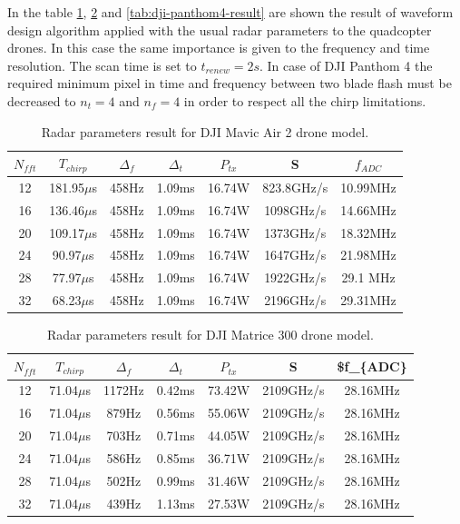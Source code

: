 In the table \ref{tab:dji-air2-result}, \ref{tab:dji-matrice300-result} and \ref{tab:dji-panthom4-result} are shown the result of waveform design algorithm applied with the usual radar parameters to the quadcopter drones. In this case the same importance is given to the frequency and time resolution. The scan time is set to $t_{renew} = 2s $. In case of DJI Panthom 4 the required minimum pixel in time and frequency between two blade flash must be decreased to $n_t = 4$ and $n_f = 4$ in order to respect all the chirp limitations.\\

\begin{table}[h!]
\centering
\begin{tabular}{|c|c|c|c|c|c|c|}
\hline
$N_{fft}$ & $T_{chirp}$ & $\Delta_f$ & $\Delta_t$ & $P_{tx}$ & S & $f_{ADC}$ \\ \hline
12 & 181.95$\mu$s & 458Hz & 1.09ms & 16.74W & 823.8GHz/s & 10.99MHz \\ \hline
16 & 136.46$\mu$s & 458Hz & 1.09ms & 16.74W & 1098GHz/s & 14.66MHz \\ \hline
20 & 109.17$\mu$s & 458Hz & 1.09ms & 16.74W & 1373GHz/s & 18.32MHz \\ \hline
24 & 90.97$\mu$s & 458Hz & 1.09ms & 16.74W & 1647GHz/s & 21.98MHz \\ \hline
28 & 77.97$\mu$s & 458Hz & 1.09ms & 16.74W & 1922GHz/s & 29.1 MHz \\ \hline
32 & 68.23$\mu$s & 458Hz & 1.09ms & 16.74W & 2196GHz/s & 29.31MHz \\ \hline
\end{tabular}
\caption{Radar parameters result for DJI Mavic Air 2 drone model.}
\label{tab:dji-air2-result}
\end{table}

\begin{table}[h!]
\centering
\begin{tabular}{|c|c|c|c|c|c|c|}
\hline
$N_{fft}$ & $T_{chirp}$ & $\Delta_f$ & $\Delta_t$ & $P_{tx}$ & S & \$f\_\{ADC\} \\ \hline
12 & 71.04$\mu$s & 1172Hz & 0.42ms & 73.42W & 2109GHz/s & 28.16MHz \\ \hline
16 & 71.04$\mu$s & 879Hz & 0.56ms & 55.06W & 2109GHz/s & 28.16MHz \\ \hline
20 & 71.04$\mu$s & 703Hz & 0.71ms & 44.05W & 2109GHz/s & 28.16MHz \\ \hline
24 & 71.04$\mu$s & 586Hz & 0.85ms & 36.71W & 2109GHz/s & 28.16MHz \\ \hline
28 & 71.04$\mu$s & 502Hz & 0.99ms & 31.46W & 2109GHz/s & 28.16MHz \\ \hline
32 & 71.04$\mu$s & 439Hz & 1.13ms & 27.53W & 2109GHz/s & 28.16MHz \\ \hline
\end{tabular}
\caption{Radar parameters result for DJI Matrice 300 drone model.}
\label{tab:dji-matrice300-result}
\end{table}

